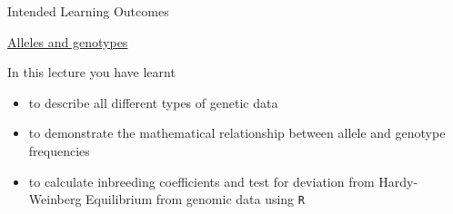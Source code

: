 \begin{frame}{Intended Learning Outcomes}

	\underline{Alleles and genotypes}

        \bigskip

	In this lecture you have learnt
	\begin{itemize}
		\item to describe all different types of genetic data
		\item to demonstrate the mathematical relationship between allele and genotype frequencies
		\item to calculate inbreeding coefficients and test for deviation from 
		Hardy-Weinberg Equilibrium from genomic data using \texttt{R}
	\end{itemize}

\end{frame}




